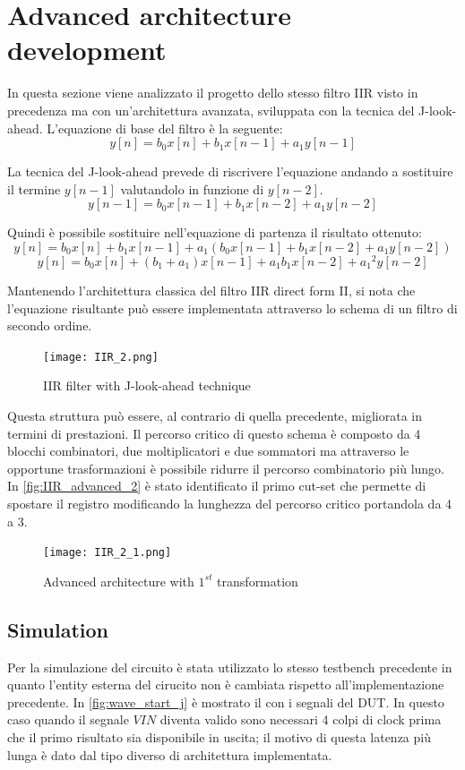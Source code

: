 \section{Advanced architecture development}
In questa sezione viene analizzato il progetto dello stesso filtro IIR visto in precedenza ma con un'architettura avanzata, sviluppata con la tecnica del J-look-ahead. L'equazione di base del filtro è la seguente:
$$ y[n] = b_0x[n] + b_1x[n-1] + a_1y[n-1]$$

La tecnica del J-look-ahead prevede di riscrivere l'equazione andando a sostituire il termine $y[n-1]$ valutandolo in funzione di $y[n-2]$.
$$ y[n-1] = b_0x[n-1] + b_1x[n-2] + a_1y[n-2]$$

Quindi è possibile sostituire nell'equazione di partenza il risultato ottenuto:
$$ y[n] = b_0x[n] + b_1x[n-1] + a_1(b_0x[n-1] + b_1x[n-2] + a_1y[n-2])$$
$$ y[n] = b_0x[n] + (b_1 + a_1)x[n-1] + a_1b_1x[n-2] + {a_1}^{2}y[n-2]$$

Mantenendo l'architettura classica del filtro IIR direct form II, si nota che l'equazione risultante può essere implementata attraverso lo schema di un filtro di secondo ordine.

\begin{figure}[h]
	\center
	\texttt{[image: IIR\_2.png]}
	\caption{IIR filter with J-look-ahead technique}
	\label{fig:IIR_advanced}
\end{figure}

Questa struttura può essere, al contrario di quella precedente, migliorata in termini di prestazioni. Il percorso critico di questo schema è composto da 4 blocchi combinatori, due moltiplicatori e due sommatori ma attraverso le opportune trasformazioni è possibile ridurre il percorso combinatorio più lungo. In \autoref{fig:IIR_advanced_2} è stato identificato il primo cut-set che permette di spostare il registro modificando la lunghezza del percorso critico portandola da 4 a 3.

\begin{figure}[h]
	\center
	\texttt{[image: IIR\_2\_1.png]}
	\caption{Advanced architecture with $1^{st}$ transformation}
	\label{fig:IIR_advanced_2}
\end{figure}

\subsection{Simulation}
Per la simulazione del circuito è stata utilizzato lo stesso testbench precedente in quanto l'entity esterna del cirucito non è cambiata rispetto all'implementazione precedente.
In \autoref{fig:wave_start_j} è mostrato il con i segnali del DUT. In questo caso quando il segnale $VIN$ diventa valido sono necessari 4 colpi di clock prima che il primo risultato sia disponibile in uscita; il motivo di questa latenza più lunga è dato dal tipo diverso di architettura implementata.

